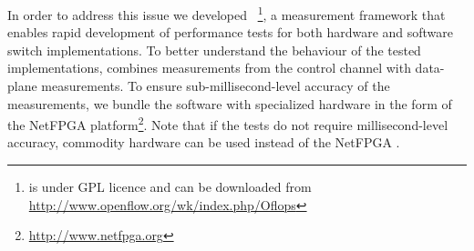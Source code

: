 In order to address this issue we developed
\oflops~\footnote{\oflops is under GPL licence and can be downloaded from
  \url{http://www.openflow.org/wk/index.php/Oflops}}, a measurement framework
that enables rapid development of performance tests for both hardware and software
\of switch implementations. To better understand the behaviour of the tested
\of implementations, \oflops combines measurements from the \of
control channel with data-plane measurements. To ensure sub-millisecond-level
accuracy of the measurements, we bundle the \oflops software with specialized
hardware in the form of the NetFPGA
platform\footnote{\url{http://www.netfpga.org}}.  Note that if the tests do not
require millisecond-level accuracy, commodity hardware can be used instead of
the NetFPGA \cite{pam-accuracy}.






